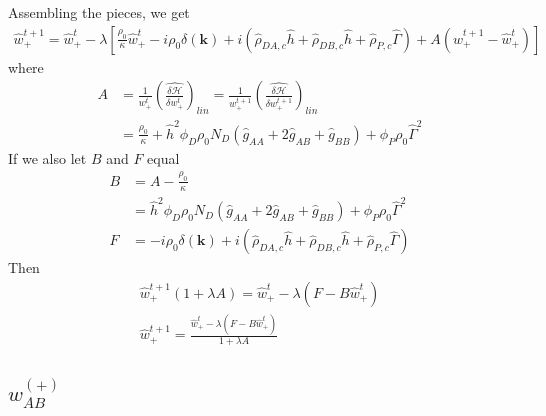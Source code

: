 \documentclass{article}
\begin{document}
Assembling the pieces, we get
\begin{align*}
  \hat{w}_+^{t+1} =
    \hat{w}_+^t - \lambda \left[
      \frac{\rho_0}{\kappa} \hat{w}_+^t
      - i \rho_0 \delta(\mathbf{k})
      + i ( \hat{\rho}_{DA,c} \hat{h}
            + \hat{\rho}_{DB,c} \hat{h}
            + \hat{\rho}_{P,c}  \hat{\Gamma} )
      + A (\hat{w}_+^{t+1} - \hat{w}_+^t)
    \right]
\end{align*}
where
\begin{align*}
  A &=
  \frac{1}{w_+^t}
  \left( \hat{\frac{\delta \mathcal{H}}{\delta w_+^t}} \right) _{lin}
  =
  \frac{1}{w_+^{t+1}}
  \left( \hat{\frac{\delta \mathcal{H}}{\delta w_+^{t+1}}} \right) _{lin} \\
  &=
  \frac{\rho_0}{\kappa}
      + \hat{h}^2 \phi_D \rho_0 N_D
        (\hat{g}_{AA} + 2 \hat{g}_{AB} + \hat{g}_{BB})
      + \phi_P \rho_0 \hat{\Gamma}^2
\end{align*}
If we also let $B$ and $F$ equal
\begin{align*}
  B &= A - \frac{\rho_0}{\kappa} \\
    &= \hat{h}^2 \phi_D \rho_0 N_D
        (\hat{g}_{AA} + 2 \hat{g}_{AB} + \hat{g}_{BB})
      + \phi_P \rho_0 \hat{\Gamma}^2 \\
  F &= - i \rho_0 \delta (\mathbf{k})
       + i ( \hat{\rho}_{DA,c} \hat{h}
            + \hat{\rho}_{DB,c} \hat{h}
            + \hat{\rho}_{P,c}  \hat{\Gamma} )
\end{align*}
Then
\begin{align*}
  \hat{w}_+^{t+1} ( 1 + \lambda A ) =
  \hat{w}_+^t - \lambda \left( F - B \hat{w}_+^t \right) \\
  \hat{w}_+^{t+1} =
  \frac{\hat{w}_+^t - \lambda \left( F - B \hat{w}_+^t \right)}
       {1 + \lambda A}
\end{align*}

\subsection{$w_{AB}^{(+)}$}
\end{document}
